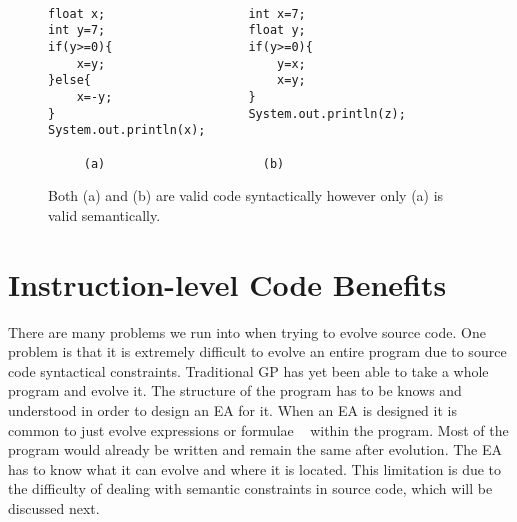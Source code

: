 \documentclass{sig-alternate}
\begin{document}
\begin{figure}
\centering
{\tt
\begin{verbatim}
float x;                    int x=7;
int y=7;                    float y;
if(y>=0){                   if(y>=0){
    x=y;                        y=x;
}else{                          x=y;
    x=-y;                   }
}                           System.out.println(z);
System.out.println(x);	
     
     (a)                      (b)

\end{verbatim}
}
\caption{Both (a) and (b) are valid code syntactically however only (a) is valid semantically.}
\label{semantics}
\end{figure}



\section{Instruction-level Code Benefits}

There are many problems we run into when trying to evolve source code. One problem is that it is extremely difficult to evolve an entire program due to source code syntactical constraints. Traditional GP has yet been able to take a whole program and evolve it. The structure of the program has to be knows and understood in order to design an EA for it. When an EA is designed it is common to just evolve expressions or formulae ~\cite{FINCH:2011} within the program. Most of the program would already be written and remain the same after evolution. The EA has to know what it can evolve and where it is located. This limitation is due to the difficulty of dealing with semantic constraints in source code, which will be discussed next.
\end{document}
